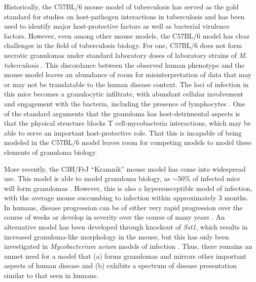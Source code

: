 Historically, the C57BL/6 mouse model of tuberculosis has served as the gold standard for studies on host\hyp{}pathogen interactions in tuberculosis and has been used to identify major host\hyp{}protective factors as well as bacterial virulence factors. However, even among other mouse models, the C57BL/6 model has clear challenges in the field of tuberculosis biology. For one, C57BL/6 does not form necrotic granulomas under standard laboratory doses of laboratory strains of \textit{M. tuberculosis} \citep{Orme1998}. This discordance between the observed human phenotype and the mouse model leaves an abundance of room for misinterpretation of data that may or may not be translatable to the human disease context. The loci of infection in this mice becomes a granulocytic infiltrate, with abundant cellular involvement and engagement with the bacteria, including the presence of lymphocytes \citep{Ulrichs2006, Hunter2007}. One of the standard arguments that the granuloma has host\hyp{}detrimental aspects is that the physical structure blocks T cell\hyp{}mycobacteria interactions, which may be able to serve an important host\hyp{}protective role. That this is incapable of being modeled in the C57BL/6 model leaves room for competing models to model these elements of granuloma biology.

More recently, the C3H/FeJ ``Kramnik'' mouse model has come into widespread use. This model is able to model granuloma biology, as ${\sim}$50\% of infected mice will form granulomas \citep{Harper2012, Lenaerts2015}. However, this is also a hypersusceptible model of infection, with the average mouse succumbing to infection within approximately 3 months. In humans, disease progression can be of either very rapid progression over the course of weeks or develop in severity over the course of many years \citep{Tiemersma2011}. An alternative model has been developed through knockout of \textit{Sst1}, which results in increased granuloma-like morphology in the mouse, but this has only been investigated in \textit{Mycobacterium avium} models of infection \citep{Rosenbloom2021}. Thus, there remains an unmet need for a model that (a) forms granulomas and mirrors other important aspects of human disease and (b) exhibits a spectrum of disease presentation similar to that seen in humans. 


